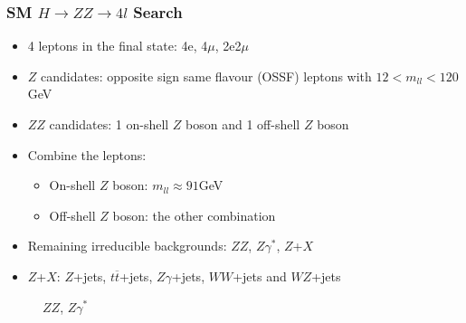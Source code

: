 \documentclass[xcolor={usenames,dvipsnames,svgnames,table}]{beamer}
\begin{document}
\begin{frame}
	\frametitle{SM $H \rightarrow ZZ \rightarrow 4l$ Search}
	\begin{itemize}
		\item 4 leptons in the final state: 4e, 4$\mu$, 2e2$\mu$
		\item $Z$ candidates: opposite sign same flavour (OSSF) leptons with $12<m_{ll}<120$GeV
		\item $ZZ$ candidates: 1 on-shell $Z$ boson and 1 off-shell $Z$ boson
		\item Combine the leptons:
		\begin{itemize}
			\item On-shell $Z$ boson: $m_{ll} \approx 91$GeV
			\item Off-shell $Z$ boson: the other combination
		\end{itemize}
		\item Remaining irreducible backgrounds: $ZZ$, $Z\gamma^*$, $Z$+$X$
		\item $Z$+$X$: \textcolor{color2}{$Z$+jets}, $t\overline{t}$+jets, $Z\gamma$+jets, $WW$+jets and $WZ$+jets
	\end{itemize}
	\begin{figure}[t]
		\centering \textcolor{color1}{$ZZ$, $Z\gamma^*$}\\
		\vspace{0.25cm}
		\centering \\
	\end{figure}
\end{frame}
\end{document}
